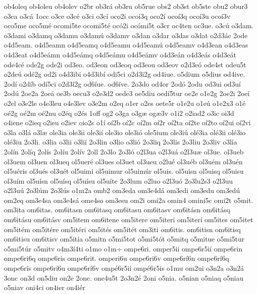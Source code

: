 {ob4oleq
ob4oleu
ob4olev
o2br
ob3r^^e1
ob3ru
ob5rue
obs2
ob3st
ob5ste
obu2
obur3
o3ca
o3c^^e1
1occ
o3ce
o3c^^e9
o3ci
o3c^^ed
oco2i
ocoi3q
oco2^^ed
oco^^ed3q
oco^^ed3u
oco^^ed3v
oco5me
oco5m^^e9
ocomi5te
ocomi5t^^e9
oc^^f32i
oc^^f3mi5t
o3cr
oc4ten
oc3ue.
o3c^^fa
o3dam.
o3dami
o3damq
o3damu
o3dam^^fa
o3damv
o3dan
o3dar
o3das
o3dat
o2d3^^e1c
2ode
o4d5eam.
o4d5eamn
o4d5eamq
o4d5eamu
o4d5eam^^fa
o4d5eamv
o4d3ean
o4d3eas
o4d3eat
o4d5e^^e1mn
o4d5e^^e1mq
o4d5e^^e1mu
o4d5e^^e1mv
o4d3e^^e1n
o4d3e^^e1s
o4d3e^^e1t
ode4c^^e9
ode2g
ode2i
od3eo.
od3eon
od3eoq
od3eou
od3eov
o2d3e^^f3
ode4st
odeu5t
o2de^^fa
od^^e92g
od2i
o4d3ibi
o4d3ib^^ed
odi5ci
o2d3i2g
od4iue.
o5dium
o5dius
od4ive.
2od^^ed
o2d^^edb
od^^ed5ci
o2d3^^ed2g
od6^^edue.
od6^^edve.
2o3do
od4or
2od^^f3
2odu
od3ui
od3u^^ed
2od^^fa
2oe2a
2oe^^e1
oe3b
oecu3
o2e3d2
oede3
oe5diu
oed^^ed5tur
oe2e
o1e2g
2oe2i
2oe^^ed
o2el
o3e2le
o4e3leu
o4e3lev
o3e2m
o2eq
o1er
o2es
oete5r
o1e2u
o1e^^fa
o1e2x3
o1^^e9
o^^e92g
o^^e92m
o^^e92nu
o2^^e9q
o2^^e9s
1off
og2
o3ga
o3g^^e6
og^^e63v
o1i2
o2iad2
o3ic
oi3d
o4iene
o2ieq
o2ieu
o2iev
oio2s
o1^^ed
o^^ed2b
o^^ed2c
o^^ed2m
o^^ed2r
o^^ed2ta
o^^ed2te
o^^ed2to
o^^ed2ui
o^^ed2vi
o3la
o3l^^e1
o3l^^e6
ole3ia
ole3ii
ole3i^^ed
ole3io
ole3i^^f3
ole5ium
ole3i^^fa
ol^^e93ia
ol^^e93ii
ol^^e93io
ol^^e93iu
2o3li.
o3lia
o3lii
o3li^^ed
2o3lin
o3lio
o3li^^f3
2o3liq
2o3lis
2o3liu
2o3liv
o3l^^eda
2ol^^edn
2ol^^edq
2ol^^eds
2ol^^edu
2ol^^edv
2oll
2o3lo
2o3l^^f3
o2l3ua
o2l3u^^e1
o2l3u^^e6
ol3ue.
ol3ueb
ol3uem
ol3uen
ol3ueq
ol5uer^^e9
ol3ues
ol3uet
ol3ueu
o2lu^^e9
ol3u^^e9b
ol3u^^e9m
ol3u^^e9n
ol5u^^e9ris
ol3u^^e9s
ol3u^^e9t
ol5uimi
ol5uimur
ol5uim^^far
ol5uis.
ol5uisn
ol5uisq
ol5uisu
ol3u^^edm
ol5u^^edsn
ol5u^^edsq
ol5u^^edsu
ol5u^^edte
2o3lum
o2luo
o2l3u^^f3
2o3lu2s3
o2l3uu
o2l3u^^fa
2o3l^^fam
2o3l^^fas
o1m2a
omb2
om3eda
om3e4d^^e1
om3edi
om3edu
om3ed^^fa
om2eq
om3e4sa
om3e4s^^e1
ome4so
om3esu
om2i
omi2a
omin4
omini5c
omi2t
o5mit.
om3ita
om6itas.
om6itasn
om6itasq
om6itasu
om6itasv
om6it^^e1sn
om6it^^e1sq
om6it^^e1su
om6it^^e1sv
om5item
om6itene
om5itere
om5iteri
om5iter^^ed
om5ites
om5itet
om5it^^e9m
om5it^^e9re
om5it^^e9ri
om5it^^e9s
om5it^^e9t
om3iti
om6itis.
om6itisn
om6itisq
om6itisu
om6itisv
om5it^^eda
o5mitn
o5mi5tot
o5mi5t^^f3t
o5mitq
o5mitue
o5mi5tur
o5mi5t^^far
o5mitv
o4m3^^ed4ti
o1mo
o1m^^f7
ompe6ri.
omper5ii
ompe6r5i^^ed
ompe6rin
ompe6ri6q
ompe6ris
ompe6rit.
omperi6u
ompe6ri6v
ompe6r^^ed6n
ompe6r^^ed6q
ompe6r^^eds
ompe6r^^ed6u
ompe6r^^ed6v
omp^^e96r5ii
omp^^e96r5is
o1mu
om2ui
o3n2a
o3n2^^e1
3onc
on3d
on5diu
on2e
2one.
one4u5t
2o3n2^^e9
2oni
o5nia.
o5nian
o5niaq
o5niau
o5niav
oni4ci
on4ier
on4i^^e9r
}
